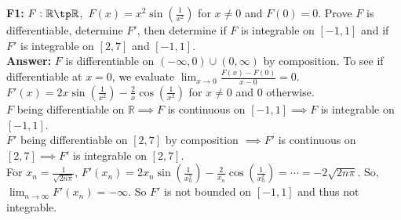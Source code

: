 \documentclass{article}
\begin{document}
        \noindent \textbf{F1: }$F: \mathbb{R} \tp \mathbb{R}$, $\, F(x) = x^2\sin (\frac{1}{x^2})$ for $x \neq 0$ and $F(0) = 0$. Prove $F$ is differentiable, determine $F'$, then determine if $F$ is integrable on $[-1,1]$ and if $F'$ is integrable on $[2,7]$ and $[-1,1]$.\\
        \textbf{Answer: }$F$ is differentiable on $(-\infty,0) \cup (0, \infty)$ by composition. To see if differentiable at $x=0$, we evaluate $\lim_{x\to0}\frac{F(x)-F(0)}{x-0} = 0$.\\
        $F'(x) = 2x\sin(\frac{1}{x^2})-\frac{2}{x}\cos(\frac{1}{x^2})$ for $x \neq 0$ and $0$ otherwise.\\
        $F$ being differentiable on $\mathbb{R} \implies F$ is continuous on $[-1,1] \implies F$ is integrable on $[-1,1]$.\\
        $F'$ being differentiable on $[2,7]$ by composition $\implies F'$ is continuous on $[2,7] \implies F'$ is integrable on $[2,7]$.\\
        For $x_n = \frac{1}{\sqrt{2n\pi}}, \,F'(x_n) = 2x_n \sin(\frac{1}{x_n^2})-\frac{2}{x_n}\cos(\frac{1}{x_n^2}) = \cdots = -2\sqrt{2n\pi}$. So, $\lim_{n \to \infty} F'(x_n) = -\infty$. So $F'$ is not bounded on $[-1,1]$ and thus not integrable.
\end{document}

